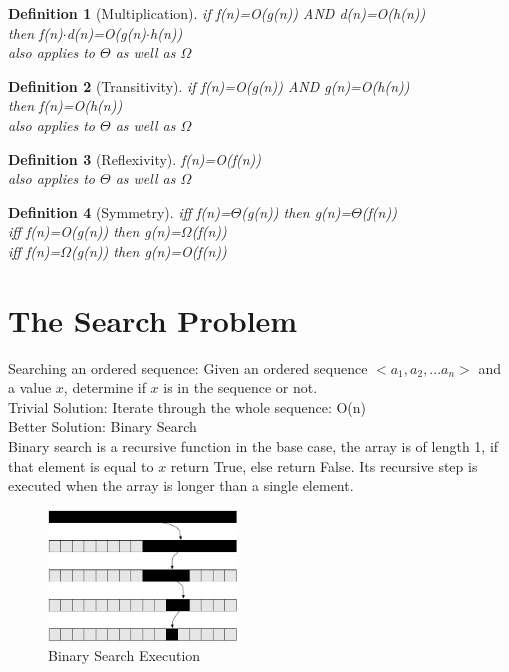 \documentclass[12pt,letterpaper]{article}
\newtheorem{definition}{Definition}[section]
\begin{document}
\begin{definition}[Multiplication]\hfill \break
if f(n)=O(g(n)) AND d(n)=O(h(n))\\
then f(n)$\cdot$d(n)=O(g(n)$\cdot$h(n))\\
also applies to $\Theta$ as well as $\Omega$\\
\end{definition}

\begin{definition}[Transitivity]\hfill \break
if f(n)=O(g(n)) AND g(n)=O(h(n))\\
then f(n)=O(h(n))\\
also applies to $\Theta$ as well as $\Omega$\\
\end{definition}

\begin{definition}[Reflexivity]\hfill \break
f(n)=O(f(n))\\
also applies to $\Theta$ as well as $\Omega$\\
\end{definition}

\begin{definition}[Symmetry]\hfill \break
iff f(n)=$\Theta$(g(n)) then g(n)=$\Theta$(f(n))\\
iff f(n)=O(g(n)) then g(n)=$\Omega$(f(n))\\
iff f(n)=$\Omega$(g(n)) then g(n)=O(f(n))\\
\end{definition}

\section{The Search Problem}
Searching an ordered sequence: Given an ordered sequence $<a_1, a_2, ... a_n>$ and a value $x$, determine if $x$ is in the sequence or not. \\
Trivial Solution: Iterate through the whole sequence: O(n)\\
Better Solution: Binary Search\\
Binary search is a recursive function in the base case, the array is of length 1, if that element is equal to $x$ return True, else return False. Its recursive step is executed when the array is longer than a single element. 
\begin{figure}[h]
\centering
\includegraphics[width=5cm]{binsearch}
\caption{Binary Search Execution}
\end{figure}
\end{document}

